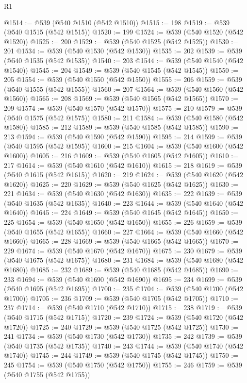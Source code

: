 \begin{lexlean}{R1}
\begin{coremodule}
{{{{{{{{{{{{{{{{{{{{{{{{{{{{{{{{{{{{{{{{@1514 := @539 (@540 @1510 (@542 @1510))
@1515 := 198
@1519 := @539 (@540 @1515 (@542 @1515))
@1520 := 199
@1524 := @539 (@540 @1520 (@542 @1520))
@1525 := 200
@1529 := @539 (@540 @1525 (@542 @1525))
@1530 := 201
@1534 := @539 (@540 @1530 (@542 @1530))
@1535 := 202
@1539 := @539 (@540 @1535 (@542 @1535))
@1540 := 203
@1544 := @539 (@540 @1540 (@542 @1540))
@1545 := 204
@1549 := @539 (@540 @1545 (@542 @1545))
@1550 := 205
@1554 := @539 (@540 @1550 (@542 @1550))
@1555 := 206
@1559 := @539 (@540 @1555 (@542 @1555))
@1560 := 207
@1564 := @539 (@540 @1560 (@542 @1560))
@1565 := 208
@1569 := @539 (@540 @1565 (@542 @1565))
@1570 := 209
@1574 := @539 (@540 @1570 (@542 @1570))
@1575 := 210
@1579 := @539 (@540 @1575 (@542 @1575))
@1580 := 211
@1584 := @539 (@540 @1580 (@542 @1580))
@1585 := 212
@1589 := @539 (@540 @1585 (@542 @1585))
@1590 := 213
@1594 := @539 (@540 @1590 (@542 @1590))
@1595 := 214
@1599 := @539 (@540 @1595 (@542 @1595))
@1600 := 215
@1604 := @539 (@540 @1600 (@542 @1600))
@1605 := 216
@1609 := @539 (@540 @1605 (@542 @1605))
@1610 := 217
@1614 := @539 (@540 @1610 (@542 @1610))
@1615 := 218
@1619 := @539 (@540 @1615 (@542 @1615))
@1620 := 219
@1624 := @539 (@540 @1620 (@542 @1620))
@1625 := 220
@1629 := @539 (@540 @1625 (@542 @1625))
@1630 := 221
@1634 := @539 (@540 @1630 (@542 @1630))
@1635 := 222
@1639 := @539 (@540 @1635 (@542 @1635))
@1640 := 223
@1644 := @539 (@540 @1640 (@542 @1640))
@1645 := 224
@1649 := @539 (@540 @1645 (@542 @1645))
@1650 := 225
@1654 := @539 (@540 @1650 (@542 @1650))
@1655 := 226
@1659 := @539 (@540 @1655 (@542 @1655))
@1660 := 227
@1664 := @539 (@540 @1660 (@542 @1660))
@1665 := 228
@1669 := @539 (@540 @1665 (@542 @1665))
@1670 := 229
@1674 := @539 (@540 @1670 (@542 @1670))
@1675 := 230
@1679 := @539 (@540 @1675 (@542 @1675))
@1680 := 231
@1684 := @539 (@540 @1680 (@542 @1680))
@1685 := 232
@1689 := @539 (@540 @1685 (@542 @1685))
@1690 := 233
@1694 := @539 (@540 @1690 (@542 @1690))
@1695 := 234
@1699 := @539 (@540 @1695 (@542 @1695))
@1700 := 235
@1704 := @539 (@540 @1700 (@542 @1700))
@1705 := 236
@1709 := @539 (@540 @1705 (@542 @1705))
@1710 := 237
@1714 := @539 (@540 @1710 (@542 @1710))
@1715 := 238
@1719 := @539 (@540 @1715 (@542 @1715))
@1720 := 239
@1724 := @539 (@540 @1720 (@542 @1720))
@1725 := 240
@1729 := @539 (@540 @1725 (@542 @1725))
@1730 := 241
@1734 := @539 (@540 @1730 (@542 @1730))
@1735 := 242
@1739 := @539 (@540 @1735 (@542 @1735))
@1740 := 243
@1744 := @539 (@540 @1740 (@542 @1740))
@1745 := 244
@1749 := @539 (@540 @1745 (@542 @1745))
@1750 := 245
@1754 := @539 (@540 @1750 (@542 @1750))
@1755 := 246
@1759 := @539 (@540 @1755 (@542 @1755))
}}}}}}}}}}}}}}}}}}}}}}}}}}}}}}}}}}}}}}}}
\end{coremodule}
\end{lexlean}
